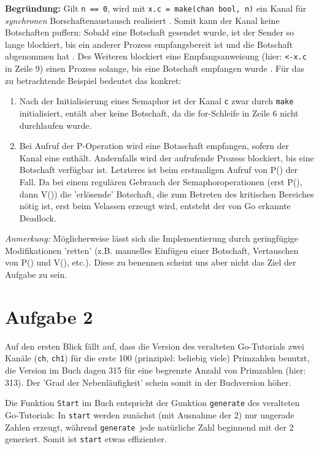 \documentclass[11pt,a4paper,DIV=10,]{scrartcl}
\begin{document}
\textbf{Begründung:} Gilt \texttt{n == 0}, wird mit \texttt{x.c = make(chan bool, n)} ein Kanal für \textit{synchronen} Borschaftenaustausch realisiert \citep[vgl.][S. 168]{Maurer.2012}. Somit kann der Kanal keine Botschaften puffern: Sobald eine Botschaft gesendet wurde, ist der Sender so lange blockiert, bis ein anderer Prozess empfangsbereit ist und die Botschaft abgenommen hat \citep[vgl.][S. 166]{Maurer.2012}. Des Weiteren blockiert eine Empfangsanweisung (hier: \texttt{<-x.c} in Zeile 9) einen Prozess solange, bis eine Botschaft empfangen wurde \cite[vgl.][]{TourOfGo}. Für das zu betrachtende Beispiel bedeutet das konkret: 
\begin{enumerate}
\item Nach der Initialisierung eines Semaphor ist der Kanal \texttt{c} zwar durch \texttt{make} initialisiert, entält aber keine Botschaft, da die for-Schleife in Zeile 6 nicht durchlaufen wurde.
\item Bei Aufruf der P-Operation wird eine Botaschaft empfangen, sofern der Kanal eine enthält. Andernfalls wird der aufrufende Prozess blockiert, bis eine Botschaft verfügbar ist. Letzteres ist beim erstmaligen Aufruf von P() der Fall. Da bei einem regulären Gebrauch der Semaphoroperationen (erst P(), dann V()) die 'erlösende' Botschaft, die zum Betreten des kritischen Bereiches nötig ist, erst beim Velassen erzeugt wird, entsteht der von Go erkannte Deadlock. 
\end{enumerate}
\textit{Anmerkung:} Möglicherweise lässt sich die Implementierung durch geringfügige Modifikationen 'retten' (z.B. manuelles Einfügen einer Botschaft, Vertauschen von P() und V(), etc.). Diese zu benennen scheint uns aber nicht das Ziel der Aufgabe zu sein.
\section*{Aufgabe 2}
Auf den ersten Blick fällt auf, dass die Version des veralteten Go-Tutorials zwei Kanäle (\texttt{ch}, \texttt{ch1}) für die erste 100 (prinzipiel: beliebig viele) Primzahlen benutzt, die Version im Buch dagen 315 für eine begrenzte Anzahl von Primzahlen (hier: 313). Der 'Grad der Nebenläufigkeit' schein somit in der Buchversion höher.
   
Die Funktion \texttt{Start} im Buch entspricht der Gunktion \texttt{generate} des veralteten Go-Tutorials: In \texttt{start} werden zunächst (mit Ausnahme der 2) nur ungerade Zahlen erzeugt, während \texttt{generate }jede natürliche Zahl beginnend mit der 2 generiert. Somit ist \texttt{start} etwas effizienter.
\end{document}
